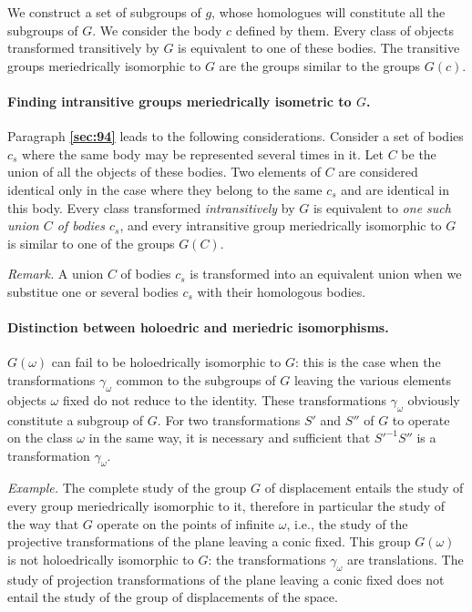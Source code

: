 \documentclass[leqno,11pt]{book}
\numberwithin{equation}{chapter}
\theoremstyle{shape1}
\theoremstyle{shapesmall}
\newcommand{\fsref}[1]{{\rm\textsection\textbf{\ref{sec:#1}}}}
\newcommand{\somespace}{\vspace{9pt}}
\begin{document}
\somespace

We construct a set of subgroups of $g$, whose homologues will constitute all the subgroups of $G$. We consider the body $c$ defined by them. Every class of objects transformed transitively by $G$ is equivalent to one of these bodies. The transitive groups meriedrically isomorphic to $G$ are the groups similar to the groups $G(c)$.

\paragraph{Finding intransitive groups meriedrically isometric to $G$.}
\label{sec:96}
Paragraph \fsref{94} leads to the following considerations. Consider a set of bodies $c_{s}$ where the same body may be represented several times in it. Let $C$ be the union of all the objects of these bodies. Two elements of $C$ are considered identical only in the case where they belong to the same $c_{s}$ and are identical in this body. Every class transformed \emph{intransitively} by $G$ is equivalent to \emph{one such union $C$ of bodies $c_{s}$}, and every intransitive group meriedrically isomorphic to $G$ is similar to one of the groups $G(C)$.

\somespace

\emph{Remark.} A union $C$ of bodies $c_{s}$ is transformed into an equivalent union when we substitue one or several bodies $c_{s}$ with their homologous bodies.


\paragraph{Distinction between holoedric and meriedric isomorphisms.}
\label{sec:97}
$G(\omega)$ can fail to be holoedrically isomorphic to $G$: this is the case when the transformations $\gamma_{\omega}$ common to the subgroups of $G$ leaving the various elements objects $\omega$ fixed do not reduce to the identity. These transformations $\gamma_{\omega}$ obviously constitute a subgroup of $G$. For two transformations $S'$ and $S''$ of $G$ to operate on the class $\omega$ in the same way, it is necessary and sufficient that $S'^{-1}S''$ is a transformation $\gamma_{\omega}$.

\somespace

{\small
\emph{Example.} The complete study of the group $G$ of displacement entails the study of every group meriedrically isomorphic to it, therefore in particular the study of the way that $G$ operate on the points of infinite $\omega$, i.e., the study of the projective transformations of the plane leaving a conic fixed. This group $G(\omega)$ is not holoedrically isomorphic to $G$: the transformations $\gamma_{\omega}$ are translations. The study of projection transformations of the plane leaving a conic fixed does not entail the study of the group of displacements of the space.
}
\end{document}
